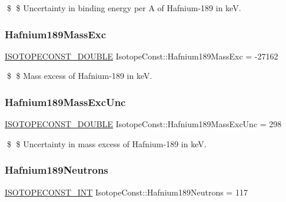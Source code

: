 \$ \$ Uncertainty in binding energy per A of Hafnium-\/189 in keV. \mbox{\label{group___isotope_const-_hafnium-_hf189_gab0d2a6bbcaebaac4053ff9edd7b053b5}} 
\subsubsection{\texorpdfstring{Hafnium189\+Mass\+Exc}{Hafnium189MassExc}}
{\footnotesize\ttfamily \mbox{\hyperlink{group___isotope_const-_macros_ga8f45a7272ce02c0b4c65c44636ed719a}{I\+S\+O\+T\+O\+P\+E\+C\+O\+N\+S\+T\+\_\+\+D\+O\+U\+B\+LE}} Isotope\+Const\+::\+Hafnium189\+Mass\+Exc = -\/27162}

\$ \$ Mass excess of Hafnium-\/189 in keV. \mbox{\label{group___isotope_const-_hafnium-_hf189_gae0599f84cd210ef1fb2b116feebeb3e0}} 
\subsubsection{\texorpdfstring{Hafnium189\+Mass\+Exc\+Unc}{Hafnium189MassExcUnc}}
{\footnotesize\ttfamily \mbox{\hyperlink{group___isotope_const-_macros_ga8f45a7272ce02c0b4c65c44636ed719a}{I\+S\+O\+T\+O\+P\+E\+C\+O\+N\+S\+T\+\_\+\+D\+O\+U\+B\+LE}} Isotope\+Const\+::\+Hafnium189\+Mass\+Exc\+Unc = 298}

\$ \$ Uncertainty in mass excess of Hafnium-\/189 in keV. \mbox{\label{group___isotope_const-_hafnium-_hf189_ga496da2497e525b00cecf029d98fb36ed}} 
\subsubsection{\texorpdfstring{Hafnium189\+Neutrons}{Hafnium189Neutrons}}
{\footnotesize\ttfamily \mbox{\hyperlink{group___isotope_const-_macros_ga5f18360b3e99483a35c32d789e62621c}{I\+S\+O\+T\+O\+P\+E\+C\+O\+N\+S\+T\+\_\+\+I\+NT}} Isotope\+Const\+::\+Hafnium189\+Neutrons = 117}


